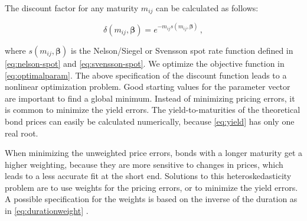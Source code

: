 The discount factor for any maturity $m_{ij}$ can be calculated as follows:

\begin{displaymath}
\delta(m_{ij}, \bm{\beta})=e^{-m_{ij}s(m_{ij},\bm{\beta})}\,,
\end{displaymath}

where $s(m_{ij},\bm{\beta})$ is the Nelson/Siegel or Svensson spot rate function defined in \eqref{eq:nelson-spot} and \eqref{eq:svensson-spot}. We optimize the objective function in \eqref{eq:optimalparam}. The above specification of the discount function leads to a nonlinear optimization problem. Good starting values for the parameter vector are important to find a global minimum. Instead of minimizing pricing errors, it is common to minimize the yield errors. The yield-to-maturities of the theoretical bond prices can easily be calculated numerically, because \eqref{eq:yield} has only one real root. 

When minimizing the unweighted price errors, bonds with a longer maturity get a higher weighting, because they are more sensitive to changes in prices, which leads to a less accurate fit at the short end. Solutions to this heteroskedasticity problem are to use weights for the pricing errors, or to minimize the yield errors. A possible specification for the weights is based on the inverse of the duration as in \eqref{eq:durationweight} \citep[see][]{Bliss1997}.


